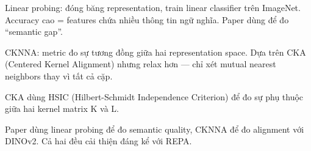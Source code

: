 \begin{frame}[t]
{    Linear probing: đóng băng representation, train linear classifier
    trên ImageNet. Accuracy cao = features chứa nhiều thông tin ngữ
    nghĩa. Paper dùng để đo ``semantic gap''.

    CKNNA: metric đo sự tương đồng giữa hai representation space.
    Dựa trên CKA (Centered Kernel Alignment) nhưng relax hơn —
    chỉ xét mutual nearest neighbors thay vì tất cả cặp.

    CKA dùng HSIC (Hilbert-Schmidt Independence Criterion) để đo
    sự phụ thuộc giữa hai kernel matrix K và L.

    Paper dùng linear probing để đo semantic quality, CKNNA để đo
    alignment với DINOv2. Cả hai đều cải thiện đáng kể với REPA.
  }
\end{frame}

